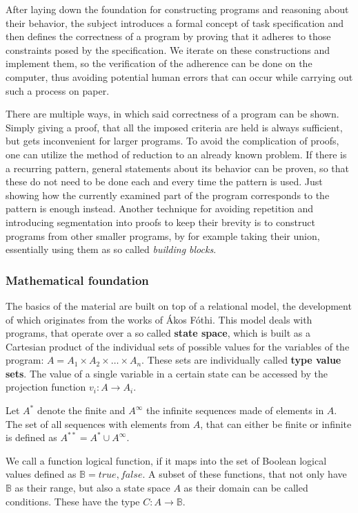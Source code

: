 After laying down the foundation for constructing programs and reasoning about their behavior, the subject introduces a formal concept of task specification and then defines the correctness of a program by proving that it adheres to those constraints posed by the specification. We iterate on these constructions and implement them, so the verification of the adherence can be done on the computer, thus avoiding potential human errors that can occur while carrying out such a process on paper.

There are multiple ways, in which said correctness of a program can be shown. Simply giving a proof, that all the imposed criteria are held is always sufficient, but gets inconvenient for larger programs. To avoid the complication of proofs, one can utilize the method of reduction to an already known problem. If there is a recurring pattern, general statements about its behavior can be proven, so that these do not need to be done each and every time the pattern is used. Just showing how the currently examined part of the program corresponds to the pattern is enough instead. Another technique for avoiding repetition and introducing segmentation into proofs to keep their brevity is to construct programs from other smaller programs, by for example taking their union, essentially using them as so called \textit{building blocks}.

\subsubsection{Mathematical foundation}

The basics of the material are built on top of a relational model, the development of which originates from the works of Ákos Fóthi\cite{fothi1988mathematical}. This model deals with programs, that operate over a so called \textbf{state space}, which is built as a Cartesian product of the individual sets of possible values for the variables of the program: $A = A_1 \times A_2 \times \ldots \times A_n$. These sets are individually called \textbf{type value sets}. The value of a single variable in a certain state can be accessed by the projection function $v_i : A \to A_i$.

Let $A^*$ denote the finite and $A^\infty$ the infinite sequences made of elements in $A$. The set of all sequences with elements from $A$, that can either be finite or infinite is defined as $A^{**} = A^* \cup A^\infty$.

We call a function logical function, if it maps into the set of Boolean logical values defined as $\mathbb{B} = {true , false}$. A subset of these functions, that not only have $\mathbb{B}$ as their range, but also a state space $A$ as their domain can be called conditions. These have the type $C : A \to \mathbb{B}$.

